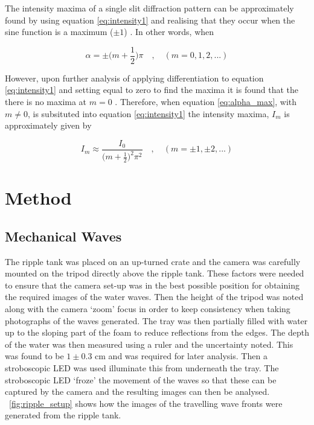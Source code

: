\documentclass{article}
\newcommand{\figref}[2][\figurename~]{#1\ref{#2}}
\begin{document}
\vspace{2mm}
\noindent
The intensity maxima of a single slit diffraction pattern can be approximately found by using equation \eqref{eq:intensity1} and realising that they occur when the sine function is a maximum ($\pm 1$) \cite{Book01}. In other words, when

\begin{equation}
\label{eq:alpha_max}
\alpha = \pm\bigg(m + \frac{1}{2}\bigg)\pi \quad,\quad(m = 0, 1, 2, ...)
\end{equation}

\vspace{2mm}
\noindent
However, upon further analysis of applying differentiation to equation \eqref{eq:intensity1} and setting equal to zero to find the maxima it is found that the there is no maxima at $m = 0$ \cite{Book01}. Therefore, when equation \eqref{eq:alpha_max}, with $m \neq 0$, is subsituted into equation \eqref{eq:intensity1} the intensity maxima, $I_m$ is approximately given by \cite{Book01}

\vspace{2mm}
\noindent
\begin{equation}
\label{eq:max_intensity}
I_m \approx \frac{I_0}{\big(m + \frac{1}{2}\big)^2\pi^2} \quad,\quad(m =  \pm1, \pm2, ...)
\end{equation}


\section{Method}
\label{sec:method}

\subsection{Mechanical Waves}
\label{ssec:ripple-method}

\vspace{2mm}
\noindent
The ripple tank was placed on an up-turned crate and the camera was carefully mounted on the tripod directly above the ripple tank. These factors were needed to ensure that the camera set-up was in the best possible position for obtaining the required images of the water waves. Then the height of the tripod was noted along with the camera `zoom' focus in order to keep consistency when taking photographs of the waves generated. The tray was then partially filled with water up to the sloping part of the foam \cite{Paper01} to reduce reflections from the edges. The depth of the water was then measured using a ruler and the uncertainty noted. This was found to be $1 \pm 0.3$ cm and was required for later analysis. Then a stroboscopic LED was used illuminate this from underneath the tray. The stroboscopic LED `froze' the movement of the waves so that these can be captured by the camera and the resulting images can then be analysed. \figref{fig:ripple_setup} shows how the images of the travelling wave fronts were generated from the ripple tank.
\end{document}
